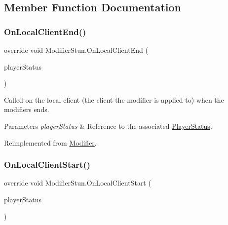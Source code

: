 \subsection{Member Function Documentation}
\hypertarget{class_modifier_stun_acb8d45decc6446515b0492ae57684092}{}\label{class_modifier_stun_acb8d45decc6446515b0492ae57684092} 
\subsubsection{\texorpdfstring{On\+Local\+Client\+End()}{OnLocalClientEnd()}}
{\footnotesize\ttfamily override void Modifier\+Stun.\+On\+Local\+Client\+End (\begin{DoxyParamCaption}\item[{\hyperlink{class_player_status}{Player\+Status}}]{player\+Status }\end{DoxyParamCaption})\hspace{0.3cm}{\ttfamily [virtual]}}



Called on the local client (the client the modifier is applied to) when the modifiers ends. 


\begin{DoxyParams}{Parameters}
{\em player\+Status} & Reference to the associated \hyperlink{class_player_status}{Player\+Status}.\\
\hline
\end{DoxyParams}


Reimplemented from \hyperlink{class_modifier_a1ea2aa04b05628c1965570396e390281}{Modifier}.

\hypertarget{class_modifier_stun_a2798f3de724e40e72bbc203b6aece7e5}{}\label{class_modifier_stun_a2798f3de724e40e72bbc203b6aece7e5} 
\subsubsection{\texorpdfstring{On\+Local\+Client\+Start()}{OnLocalClientStart()}}
{\footnotesize\ttfamily override void Modifier\+Stun.\+On\+Local\+Client\+Start (\begin{DoxyParamCaption}\item[{\hyperlink{class_player_status}{Player\+Status}}]{player\+Status }\end{DoxyParamCaption})\hspace{0.3cm}{\ttfamily [virtual]}}



